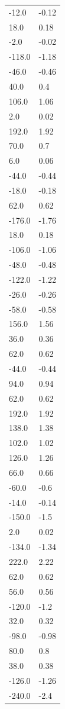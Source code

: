 \begin{longtable}{ll}
-12.0 & -0.12 \\
18.0 & 0.18 \\
-2.0 & -0.02 \\
-118.0 & -1.18 \\
-46.0 & -0.46 \\
40.0 & 0.4 \\
106.0 & 1.06 \\
2.0 & 0.02 \\
192.0 & 1.92 \\
70.0 & 0.7 \\
6.0 & 0.06 \\
-44.0 & -0.44 \\
-18.0 & -0.18 \\
62.0 & 0.62 \\
-176.0 & -1.76 \\
18.0 & 0.18 \\
-106.0 & -1.06 \\
-48.0 & -0.48 \\
-122.0 & -1.22 \\
-26.0 & -0.26 \\
-58.0 & -0.58 \\
156.0 & 1.56 \\
36.0 & 0.36 \\
62.0 & 0.62 \\
-44.0 & -0.44 \\
94.0 & 0.94 \\
62.0 & 0.62 \\
192.0 & 1.92 \\
138.0 & 1.38 \\
102.0 & 1.02 \\
126.0 & 1.26 \\
66.0 & 0.66 \\
-60.0 & -0.6 \\
-14.0 & -0.14 \\
-150.0 & -1.5 \\
2.0 & 0.02 \\
-134.0 & -1.34 \\
222.0 & 2.22 \\
62.0 & 0.62 \\
56.0 & 0.56 \\
-120.0 & -1.2 \\
32.0 & 0.32 \\
-98.0 & -0.98 \\
80.0 & 0.8 \\
38.0 & 0.38 \\
-126.0 & -1.26 \\
-240.0 & -2.4 \\

\end{longtable}
